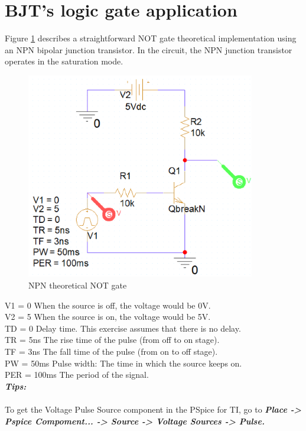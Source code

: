 \section{BJT's logic gate application}
Figure \ref{lab3_notGate_de} describes a straightforward NOT gate theoretical implementation using an NPN bipolar junction transistor. In the circuit, the NPN junction transistor operates in the saturation mode.

\begin{figure}[H]
    \centering
    \includegraphics[width=10cm]{graphics/ex12/f1.png}
    \caption{NPN theoretical NOT gate}
    \label{lab3_notGate_de}
\end{figure}

V1 = 0  When the source is off, the voltage would be 0V.\\
V2 = 5  When the source is on, the voltage would be 5V.\\
TD = 0  Delay time. This exercise assumes that there is no delay.\\
TR = 5ns  The rise time of the pulse (from off to on stage).\\
TF = 3ns  The fall time of the pulse (from on to off stage).\\
PW = 50ms  Pulse width: The time in which the source keeps on.\\
PER = 100ms  The period of the signal.\\

\textbf{\textit{Tips:}}\\
\\
To get the Voltage Pulse Source component in the PSpice for TI, go to \textbf{\textit{Place -> Pspice Compoment... -> Source -> Voltage Sources -> Pulse.}}

